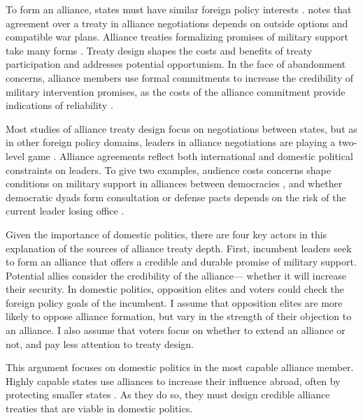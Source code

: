 \documentclass[12pt]{article}
\begin{document}
To form an alliance, states must have similar foreign policy interests \citep{Morrow1991, Smith1995, FordhamPoast2014}. 
\citep{Poast2019a} notes that agreement over a treaty in alliance negotiations depends on outside options and compatible war plans. 
Alliance treaties formalizing promises of military support take many forms \citep{Leedsetal2002, BensonClinton2016}. 
Treaty design shapes the costs and benefits of treaty participation and addresses potential opportunism.  
In the face of abandonment concerns, alliance members use formal commitments to increase the credibility of military intervention promises, as the costs of the alliance commitment provide indications of reliability \citep{Morrow2000}.


Most studies of alliance treaty design focus on negotiations between states, but as in other foreign policy domains, leaders in alliance negotiations are playing a two-level game \citep{Putnam1988}. 
Alliance agreements reflect both international and domestic political constraints on leaders. 
To give two examples, audience costs concerns shape conditions on military support in alliances between democracies \citep{Chibaetal2015, FjelstulReiter2019}, and whether democratic dyads form consultation or defense pacts depends on the risk of the current leader losing office \citep{Mattes2012a}. 


Given the importance of domestic politics, there are four key actors in this explanation of the sources of alliance treaty depth. 
First, incumbent leaders seek to form an alliance that offers a credible and durable promise of military support. 
Potential allies consider the credibility of the alliance--- whether it will increase their security. 
In domestic politics, opposition elites and voters could check the foreign policy goals of the incumbent. 
I assume that opposition elites are more likely to oppose alliance formation, but vary in the strength of their objection to an alliance. 
I also assume that voters focus on whether to extend an alliance or not, and pay less attention to treaty design.


This argument focuses on domestic politics in the most capable alliance member. 
Highly capable states use alliances to increase their influence abroad, often by protecting smaller states \citep{Morrow1994}. 
As they do so, they must design credible alliance treaties that are viable in domestic politics. 
\end{document}
